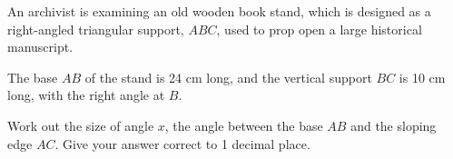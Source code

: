 \begin{question}
\noindent An archivist is examining an old wooden book stand, which is designed as a right-angled triangular support, $ABC$, used to prop open a large historical manuscript.

\noindent The base $AB$ of the stand is 24 cm long, and the vertical support $BC$ is 10 cm long, with the right angle at $B$.

\begin{center}
\end{center}

\noindent Work out the size of angle $x$, the angle between the base $AB$ and the sloping edge $AC$.
Give your answer correct to 1 decimal place.

\vspace{4.5cm}

\begin{flushright}
\end{flushright}
\end{question}
